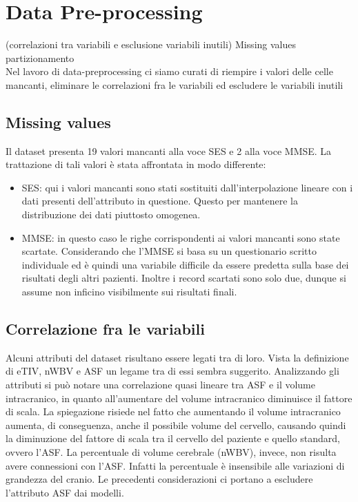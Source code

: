 \section{Data Pre-processing} (correlazioni tra variabili e esclusione variabili inutili) 
Missing values
partizionamento \\
Nel lavoro di data-preprocessing ci siamo curati di riempire i valori delle celle mancanti, eliminare le correlazioni fra le variabili  ed escludere le variabili inutili

\subsection{Missing values}
Il dataset presenta 19 valori mancanti alla voce SES e 2 alla voce MMSE. La trattazione di tali valori è stata affrontata in modo differente:
\begin{itemize}
    \item SES: qui i valori mancanti sono stati sostituiti dall'interpolazione lineare con i dati presenti dell'attributo in questione. Questo per mantenere la distribuzione dei dati piuttosto omogenea.
    \item MMSE: in questo caso le righe corrispondenti ai valori mancanti sono state scartate. Considerando che l'MMSE si basa su un questionario scritto individuale ed è quindi una variabile difficile da essere predetta sulla base dei risultati degli altri pazienti. Inoltre i record scartati sono solo due, dunque si assume non inficino visibilmente sui risultati finali.
\end{itemize}
 
\subsection{Correlazione fra le variabili}
Alcuni attributi del dataset risultano essere legati tra di loro. Vista la definizione di eTIV, nWBV e ASF un legame tra di essi sembra suggerito. Analizzando gli attributi si può notare una correlazione quasi lineare tra ASF e il volume intracranico, in quanto all'aumentare del volume intracranico diminuisce il fattore di scala. La spiegazione risiede nel fatto che aumentando il volume intracranico aumenta, di conseguenza, anche il possibile volume del cervello, causando quindi la diminuzione del fattore di scala tra il cervello del paziente e quello standard, ovvero l'ASF.
La percentuale di volume cerebrale (nWBV), invece, non risulta avere connessioni con l'ASF. Infatti la percentuale è insensibile alle variazioni di grandezza del cranio.
Le precedenti considerazioni ci portano a escludere l'attributo ASF dai modelli.

